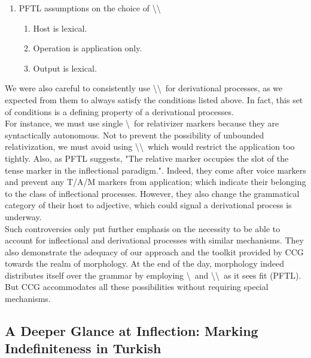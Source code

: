 \documentclass[11pt]{article} %
\begin{document}
\begin{enumerate}[resume*]
	\item PFTL assumptions on the choice of \textbackslash \textbackslash\
	\begin{enumerate}[label=(\alph*), ref=(\alph*)]\itemsep1pt
	\item Host is lexical.
	\item Operation is application only. 
	\item Output is lexical.
	\end{enumerate}
\end{enumerate}

We were also careful to consistently use \textbackslash \textbackslash\ for derivational processes, as we expected from them to always satisfy the conditions listed above. In fact, this set of conditions is a defining property of a derivational processes. \\

For instance, we must use single \textbackslash\ for relativizer markers because they are syntactically autonomous. Not to prevent the possibility of unbounded relativization, we must avoid using \textbackslash \textbackslash\ which would restrict the application too tightly. Also, as PFTL suggests, "The relative marker occupies the slot of the tense marker in the inflectional paradigm.". Indeed, they come after voice markers and prevent any T/A/M markers from application; which indicate their belonging to the class of inflectional processes. However, they also change the grammatical category of their host to adjective, which could signal a derivational process is underway. \\

Such controversies only put further emphasis on the necessity to be able to account for inflectional and derivational processes with similar mechanisms. They also demonstrate the adequacy of our approach and the toolkit provided by CCG towards the realm of morphology. At the end of the day, morphology indeed distributes itself over the grammar by employing \textbackslash\ and \textbackslash \textbackslash\ as it sees fit (PFTL). But CCG accommodates all these possibilities without requiring special mechanisms. \\

\subsection{A Deeper Glance at Inflection: Marking Indefiniteness in Turkish}
\end{document}
